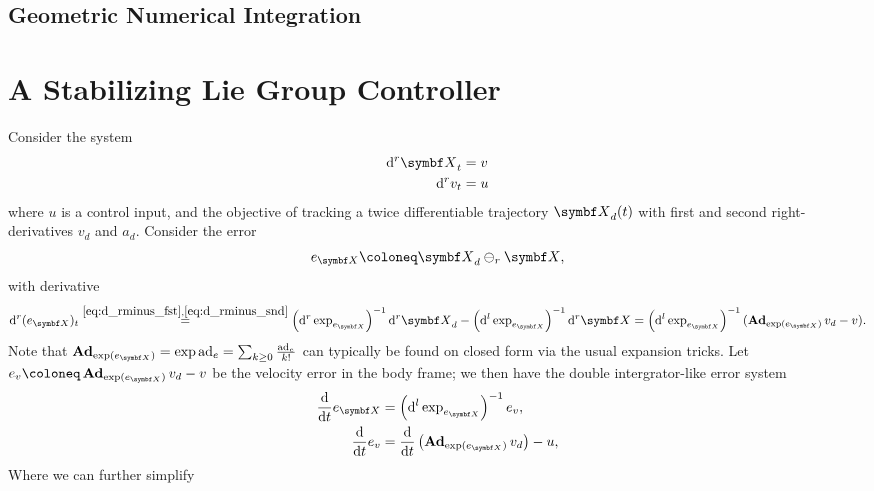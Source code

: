 
\subsection{Geometric Numerical Integration}




\section{A Stabilizing Lie Group Controller}

Consider the system
\begin{equation}
  \begin{aligned}
    \mathrm{d}^r \X_t & = v \\
    \mathrm{d}^r v_t & = u
  \end{aligned}
\end{equation}
where $u$ is a control input, and the objective of tracking a twice differentiable trajectory $\X_d(t)$ with first and second right-derivatives $v_d$ and $a_d$. Consider the error
\begin{equation}
  e_\X \coloneq \X_d \ominus_r \X,
\end{equation}
with derivative
\begin{equation}
  \mathrm{d}^r (e_\X)_t \overset{\eqref{eq:d_rminus_fst},\eqref{eq:d_rminus_snd}}= \left(\mathrm{d}^r \exp_{e_\X} \right)^{-1} \mathrm{d}^r \X_d - \left(\mathrm{d}^l \exp_{e_\X} \right)^{-1} \mathrm{d}^r \X = \left(\mathrm{d}^l \exp_{e_\X} \right)^{-1} (\bAd_{\exp(e_\X)} v_d - v).
\end{equation}
Note that $\bAd_{\exp(e_\X)} = \exp \ad_{e} = \sum_{k \geq 0} \frac{\ad_e}{k!}$ can typically be found on closed form via the usual expansion tricks. Let $e_v \coloneq \bAd_{\exp(e_\X)} v_d - v$ be the velocity error in the body frame; we then have the double intergrator-like error system
\begin{equation}
  \begin{aligned}
    \frac{\mathrm{d}}{\mathrm{d}t} e_\X &= \left(\mathrm{d}^l \exp_{e_\X} \right)^{-1} e_v,\\
    \frac{\mathrm{d}}{\mathrm{d}t} e_v &= \frac{\mathrm{d}}{\mathrm{d}t} \left( \bAd_{\exp(e_\X)} v_d\right) - u,
  \end{aligned}
\end{equation}
Where we can further simplify
